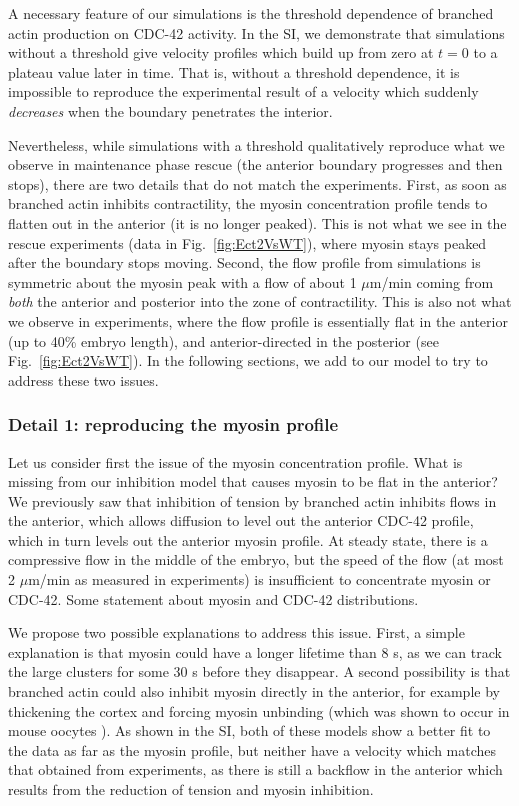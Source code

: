 \documentclass[11pt]{article}
\newcommand{\red}[1]{\color{red}#1\normalcolor}
\newcommand{\6}[1]{#1_{\text{6}}}
\newcommand{\3}[1]{#1_{\text{3}}}
\begin{document}
A necessary feature of our simulations is the threshold dependence of branched actin production on CDC-42 activity. In the SI, we demonstrate that simulations without a threshold give velocity profiles which build up from zero at $t=0$ to a plateau value later in time. That is, without a threshold dependence, it is impossible to reproduce the experimental result of a velocity which suddenly \emph{decreases} when the boundary penetrates the interior.

Nevertheless, while simulations with a threshold qualitatively reproduce what we observe in maintenance phase rescue (the anterior boundary progresses and then stops), there are two details that do not match the experiments. First, as soon as branched actin inhibits contractility, the myosin concentration profile tends to flatten out in the anterior (it is no longer peaked). This is not what we see in the rescue experiments (data in Fig.\ \ref{fig:Ect2VsWT}), where myosin stays peaked after the boundary stops moving. Second, the flow profile from simulations is symmetric about the myosin peak with a flow of about 1 $\mu$m/min coming from \emph{both} the anterior and posterior into the zone of contractility. This is also not what we observe in experiments, where the flow profile is essentially flat in the anterior (up to 40\% embryo length), and anterior-directed in the posterior (see Fig.\ \ref{fig:Ect2VsWT}). In the following sections, we add to our model to try to address these two issues.

\subsubsection{Detail 1: reproducing the myosin profile}
Let us consider first the issue of the myosin concentration profile. What is missing from our inhibition model that causes myosin to be flat in the anterior? We previously saw that inhibition of tension by branched actin inhibits flows in the anterior, which allows diffusion to level out the anterior CDC-42 profile, which in turn levels out the anterior myosin profile. At steady state, there is a compressive flow in the middle of the embryo, but the speed of the flow (at most 2 $\mu$m/min as measured in experiments) is insufficient to concentrate myosin or CDC-42. \red{Some statement about myosin and CDC-42 distributions.}

We propose two possible explanations to address this issue. First, a simple explanation is that myosin could have a longer lifetime than 8 s, as we can track the large clusters for some 30 s before they disappear. A second possibility is that branched actin could also inhibit myosin directly in the anterior, for example by thickening the cortex and forcing myosin unbinding (which was shown to occur in mouse oocytes \citep{chaigne2015narrow}). As shown in the SI, both of these models show a better fit to the data as far as the myosin profile, but neither have a velocity which matches that obtained from experiments, as there is still a backflow in the anterior which results from the reduction of tension and myosin inhibition. 
\end{document}
